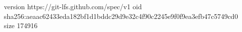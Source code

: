 version https://git-lfs.github.com/spec/v1
oid sha256:aeaac62433eda182bf1d1bddc29d9e32c4f90c2245e9f0f9ea3efb47c5749cd0
size 174916
